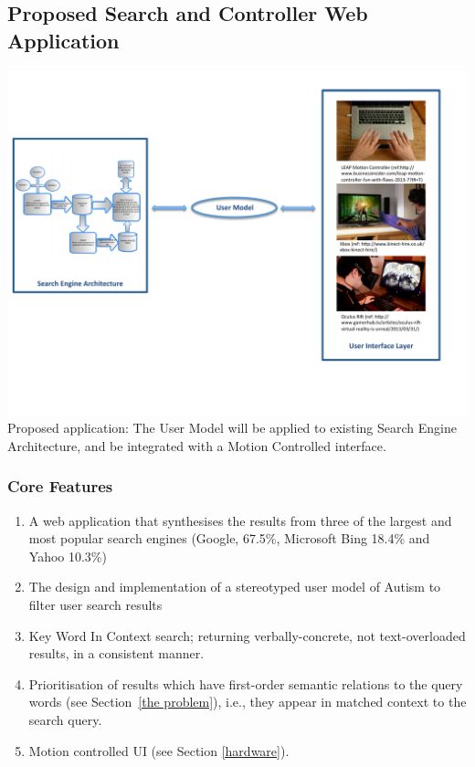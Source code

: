\documentclass[a4paper, 10pt]{article}
\begin{document}
\subsection{Proposed Search and Controller Web Application}\label{proposed}
\begin{center}
\includegraphics[scale=0.6]{searchEngArchi}\\
Proposed application: The User Model will be applied to existing Search Engine Architecture\cite{seimage}, and be integrated with a Motion Controlled interface.
\end{center}


\subsubsection{Core Features}
\begin{enumerate}
\item  A web application that synthesises the results from three of the largest and most popular search engines (Google, 67.5\%, Microsoft Bing 18.4\% and Yahoo 10.3\%) \cite{adam}

\item The design and implementation of a stereotyped user model of Autism to filter user search results

\item Key Word In Context search; returning verbally-concrete, not text-overloaded results, in a consistent manner. 

\item Prioritisation of results which have first-order semantic relations to the query words (see Section~\ref{the problem}), i.e., they appear in matched context to the search query.

\item Motion controlled UI (see Section \ref{hardware}).
\end{enumerate}
\end{document}
